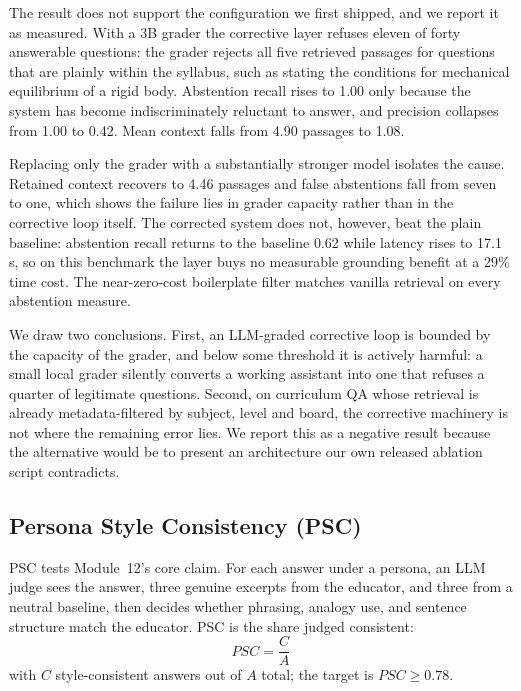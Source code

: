 \documentclass[conference]{IEEEtran}
\begin{document}
The result does not support the configuration we first shipped, and we
report it as measured. With a 3B grader the corrective layer refuses
eleven of forty answerable questions: the grader rejects all five
retrieved passages for questions that are plainly within the syllabus,
such as stating the conditions for mechanical equilibrium of a rigid
body. Abstention recall rises to 1.00 only because the system has become
indiscriminately reluctant to answer, and precision collapses from 1.00
to 0.42. Mean context falls from 4.90 passages to 1.08.

Replacing only the grader with a substantially stronger model isolates
the cause. Retained context recovers to 4.46 passages and false
abstentions fall from seven to one, which shows the failure lies in
grader capacity rather than in the corrective loop itself. The corrected
system does not, however, beat the plain baseline: abstention recall
returns to the baseline 0.62 while latency rises to 17.1\,s, so on this
benchmark the layer buys no measurable grounding benefit at a 29\% time
cost. The near-zero-cost boilerplate filter matches vanilla retrieval on
every abstention measure.

We draw two conclusions. First, an LLM-graded corrective loop is bounded
by the capacity of the grader, and below some threshold it is actively
harmful: a small local grader silently converts a working assistant into
one that refuses a quarter of legitimate questions. Second, on
curriculum QA whose retrieval is already metadata-filtered by subject,
level and board, the corrective machinery is not where the remaining
error lies. We report this as a negative result because the alternative
would be to present an architecture our own released ablation script
contradicts.
\subsection{Persona Style Consistency (PSC)}
PSC tests Module~12's core claim. For each answer under a persona, an
LLM judge sees the answer, three genuine excerpts from the educator, and
three from a neutral baseline, then decides whether phrasing, analogy
use, and sentence structure match the educator. PSC is the share judged
consistent:
\begin{equation}
    PSC = \frac{C}{A}
\end{equation}
with $C$ style-consistent answers out of $A$ total; the target is
$PSC \geq 0.78$.
\end{document}
